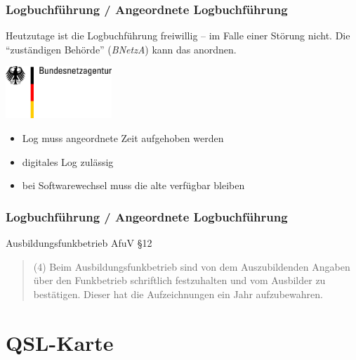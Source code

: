 \begin{frame}
    \frametitle{Logbuchführung / Angeordnete Logbuchführung}

    Heutzutage ist die Logbuchführung freiwillig -- im Falle einer Störung nicht.
    Die ``zuständigen Behörde'' (\emph{BNetzA}) kann das anordnen.

    \begin{center}
        \includegraphics[width=0.3\textwidth]{bv13/Bundesnetzagentur_logo_709px.png}
        \tiny \hyperlink{refs}{\cite{wp}}
    \end{center}

    \begin{itemize}
        \item Log muss angeordnete Zeit aufgehoben werden
        \item digitales Log zulässig
        \item bei Softwarewechsel muss die alte verfügbar bleiben
    \end{itemize}

\end{frame}

\begin{frame}
    \frametitle{Logbuchführung / Angeordnete Logbuchführung}

    \begin{exampleblock}{Ausbildungsfunkbetrieb}
      AfuV §12
      \begin{quote}
       (4) Beim Ausbildungsfunkbetrieb sind von dem Auszubildenden Angaben über den Funkbetrieb schriftlich festzuhalten und vom Ausbilder zu bestätigen. Dieser hat die Aufzeichnungen ein Jahr aufzubewahren.
      \end{quote}
    \end{exampleblock}
\end{frame}


\section{QSL-Karte}


